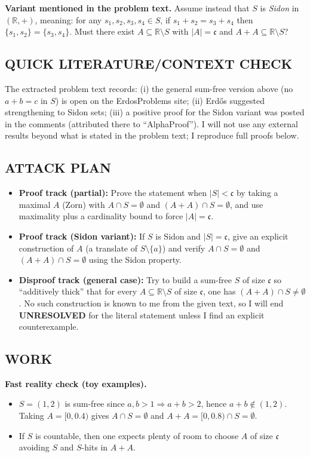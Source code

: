 \medskip
\noindent\textbf{Variant mentioned in the problem text.}
Assume instead that $S$ is \emph{Sidon} in $(\mathbb R,+)$, meaning:
for any $s_1,s_2,s_3,s_4\in S$, if $s_1+s_2=s_3+s_4$ then $\{s_1,s_2\}=\{s_3,s_4\}$.
Must there exist $A\subseteq\mathbb R\setminus S$ with $|A|=\mathfrak c$ and $A+A\subseteq\mathbb R\setminus S$?

\subsection*{QUICK LITERATURE/CONTEXT CHECK}
The extracted problem text records:
(i) the general sum-free version above (no $a+b=c$ in $S$) is open on the ErdosProblems site;
(ii) Erd\H{o}s suggested strengthening to Sidon sets;
(iii) a positive proof for the Sidon variant was posted in the comments (attributed there to ``AlphaProof'').
I will not use any external results beyond what is stated in the problem text; I reproduce full proofs below.

\subsection*{ATTACK PLAN}
\begin{itemize}
\item \textbf{Proof track (partial):} Prove the statement when $|S|<\mathfrak c$ by taking a maximal $A$ (Zorn) with $A\cap S=\emptyset$ and $(A+A)\cap S=\emptyset$, and use maximality plus a cardinality bound to force $|A|=\mathfrak c$.
\item \textbf{Proof track (Sidon variant):} If $S$ is Sidon and $|S|=\mathfrak c$, give an explicit construction of $A$ (a translate of $S\setminus\{a\}$) and verify $A\cap S=\emptyset$ and $(A+A)\cap S=\emptyset$ using the Sidon property.
\item \textbf{Disproof track (general case):} Try to build a sum-free $S$ of size $\mathfrak c$ so ``additively thick'' that for every $A\subseteq\mathbb R\setminus S$ of size $\mathfrak c$, one has $(A+A)\cap S\neq\emptyset$. No such construction is known to me from the given text, so I will end \textbf{UNRESOLVED} for the literal statement unless I find an explicit counterexample.
\end{itemize}

\subsection*{WORK}
\noindent\textbf{Fast reality check (toy examples).}
\begin{itemize}
\item $S=(1,2)$ is sum-free since $a,b>1\Rightarrow a+b>2$, hence $a+b\notin(1,2)$. Taking $A=[0,0.4)$ gives $A\cap S=\emptyset$ and $A+A=[0,0.8)\cap S=\emptyset$.
\item If $S$ is countable, then one expects plenty of room to choose $A$ of size $\mathfrak c$ avoiding $S$ and $S$-hits in $A+A$.
\end{itemize}

